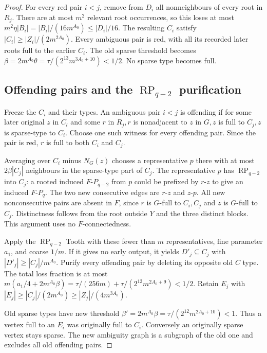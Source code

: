 \documentclass[11pt,a4paper]{article}
\theoremstyle{definition}
\theoremstyle{remark}
\numberwithin{equation}{section}
\DeclareMathOperator{\RP}{RP}
\begin{document}
\begin{proof}
For every red pair \(i<j\), remove from \(D_{i}\) all nonneighbours of every root in \(R_{j}\). There are at most \(m^{2}\) relevant root occurrences, so this loses at most \(m^{2} \eta |B_{i}|=|B_{i}|/(16m^{A_{0}})\le\allowbreak |D_{i}|/16\). The resulting \(C_{i}\) satisfy \(|C_{i}|\ge\allowbreak |Z_{i}|/(2m^{2A_{0}})\). Every ambiguous pair is red, with all its recorded later roots full to the earlier \(C_{i}\). The old sparse threshold becomes \(\beta=2m^{A_{0}} \theta=\tau/(2^{13} m^{3A_{0}+10})<1/2\). No sparse type becomes full.
\subsection{Offending pairs and the \texorpdfstring{\(\RP_{q-2}\)}{RP(q-2)} purification}\label{subsec:rpq-offending}
Freeze the \(C_{i}\) and their types. An ambiguous pair \(i<j\) is offending if for some later original \(z\) in \(C_{l}\) and some \(r\) in \(R_{j},\allowbreak  r\) is nonadjacent to \(z\) in \(G,\allowbreak  z\) is full to \(C_{j},\allowbreak  z\) is sparse-type to \(C_{i}\). Choose one such witness for every offending pair. Since the pair is red, \(r\) is full to both \(C_{i}\) and \(C_{j}\).

Averaging over \(C_{i}\) minus \(N_{G}(z)\) chooses a representative \(p\) there with at most \(2\beta |C_{j}|\) neighbours in the sparse-type part of \(C_{j}\). The representative \(p\) has \(\RP_{q-2}\) into \(C_{j}\): a rooted induced \(F\text{-}P_{q-2}\) from \(p\) could be prefixed by \(r\text{-}z\) to give an induced \(F\text{-}P_{q}\). The two new consecutive edges are \(r\text{-}z\) and \(z\text{-}p\). All new nonconsecutive pairs are absent in \(F\), since \(r\) is \(G\)-full to \(C_{i},\allowbreak C_{j}\) and \(z\) is \(G\)-full to \(C_{j}\). Distinctness follows from the root outside \(Y\) and the three distinct blocks. This argument uses no \(F\)-connectedness.

Apply the \(\RP_{q-2}\) Tooth with these fewer than \(m\) representatives, fine parameter \(a_{1}\), and coarse \(1/m\). If it gives no early output, it yields \(D'_{j}\subseteq C_{j}\) with \(|D'_{j}|\ge |C_{j}|/m^{A_{0}}\). Purify every offending pair by deleting its opposite old \(C\) type. The total loss fraction is at most \(m(a_{1}/4+2m^{A_{0}} \beta) =\tau/(256m)+\tau/(2^{12} m^{2A_{0}+9})<1/2\). Retain \(E_{j}\) with \(|E_{j}|\ge |C_{j}|/(2m^{A_{0}})\ge |Z_{j}|/(4m^{3A_{0}})\).

Old sparse types have new threshold \(\beta'=2m^{A_{0}} \beta=\tau/(2^{12} m^{2A_{0}+10})<1\). Thus a vertex full to an \(E_{i}\) was originally full to \(C_{i}\). Conversely an originally sparse vertex stays sparse. The new ambiguity graph is a subgraph of the old one and excludes all old offending pairs.


\end{proof}
\end{document}
